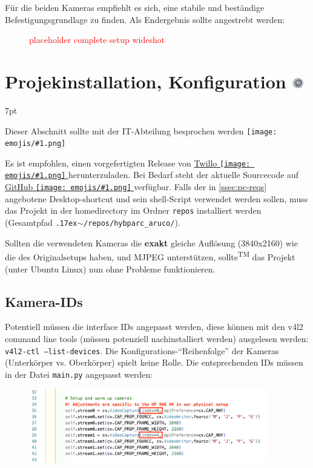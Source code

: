 \documentclass[a4paper, 10pt]{article}
\newcommand{\warn}[1]{\textcolor{red}{#1}}
\newcommand{\code}[1]{\texttt{#1}}
\newcommand{\emoji}[1]{
    \begingroup\normalfont
    \texttt{[image: emojis/\#1.png]}
    \endgroup
}
\newcommand{\realtilde}{{\raise.17ex\hbox{$\scriptstyle \mathtt{\sim}$}}}
\newenvironment{tooltip}{%
\small
\vspace*{-4mm}
    \def\FrameCommand{%
    \hspace{1pt}%
    {\color{tooltippipe}\vrule width 0.7mm}%
    {\color{tooltipshade}\vrule width 1.5mm}%
    \colorbox{tooltipshade}%
    }%
    \MakeFramed{\advance\hsize-\width\FrameRestore}%
    \noindent%
    \begin{adjustwidth}{}{7pt}%
    \vspace{2pt}\vspace{2pt}%
}
{%
    \vspace{2pt}\end{adjustwidth}\endMakeFramed%
}
\begin{document}
Für die beiden Kameras empfiehlt es sich, eine stabile und beständige Befestigungsgrundlage zu finden. Als Endergebnis sollte angestrebt werden:
\begin{figure}[H]
    \centering
    \warn{placeholder complete setup wideshot}
\end{figure}

\section{Projekinstallation, Konfiguration \includegraphics[height=0.65em]{emojis/gear.png}}
\label{sec:installation-configuration}
\begin{tooltip}
    Dieser Abschnitt sollte mit der IT-Abteilung besprochen werden\emoji{technologist}
\end{tooltip}
Es ist empfohlen, einen vorgefertigten Release von \href{https://www.twillo.de/edu-sharing/components/render/1345111e-baf1-4023-b27e-66bcd533de3a}{Twillo\emoji{link}} herunterzuladen. Bei Bedarf steht der aktuelle Sourcecode auf \href{https://github.com/leloomi/hybparc_aruco}{GitHub\emoji{link}} verfügbar. Falls der in \ref{ssec:pc-reqs} angebotene Desktop-shortcut und sein shell-Script verwendet werden sollen, muss das Projekt in der homedirectory im Ordner \code{repos} installiert werden (Gesamtpfad \code{\realtilde/repos/hybparc\_aruco/}).

Sollten die verwendeten Kameras die \textbf{exakt} gleiche Auflösung (3840x2160) wie die des Originalsetups haben, und MJPEG unterstützen, sollte\textsuperscript{\tiny TM} das Projekt (unter Ubuntu Linux) nun ohne Probleme funktionieren. 

\subsection{Kamera-IDs}
\label{ssec:cam-indices}
Potentiell müssen die interface IDs angepasst werden, diese können mit den v4l2 command line tools (müssen potenziell nachinstalliert werden) ausgelesen werden: \code{v4l2-ctl --list-devices}. Die Konfigurations-\enquote{Reihenfolge} der Kameras (Unterkörper vs. Oberkörper) spielt keine Rolle. Die entsprechenden IDs müssen in der Datei \code{main.py} angepasst werden:
\begin{figure}[H]
    \centering
    \includegraphics[width=10.5cm]{camera-indices.png}
\end{figure}
\end{document}
